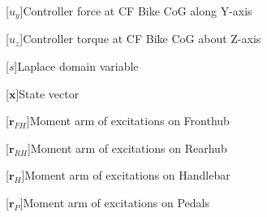 \begin{acronym}[LONGEST]
	[\ensuremath{u_y}]{\acrounit{\N}Controller force at CF Bike CoG along Y-axis}
\end{acronym}
\begin{acronym}[LONGEST]
	[\ensuremath{u_z}]{Controller torque at CF Bike CoG about Z-axis}
\end{acronym}
\begin{acronym}[LONGEST]
	[\ensuremath{s}]{\acrounit{-}Laplace domain variable}
\end{acronym}
\begin{acronym}[LONGEST]
	[\ensuremath{\mathbf{x}}]{\acrounit{-}State vector}
\end{acronym}
\begin{acronym}[LONGEST]
	[\ensuremath{\mathbf{r}_{FH}}]{\acrounit{\m}Moment arm of excitations on Fronthub}
\end{acronym}
\begin{acronym}[LONGEST]
	[\ensuremath{\mathbf{r}_{RH}}]{\acrounit{\m}Moment arm of excitations on Rearhub}
\end{acronym}
\begin{acronym}[LONGEST]
	[\ensuremath{\mathbf{r}_{H}}]{\acrounit{\m}Moment arm of excitations on Handlebar}
\end{acronym}
\begin{acronym}[LONGEST]
	[\ensuremath{\mathbf{r}_{P}}]{\acrounit{\m}Moment arm of excitations on Pedals}
\end{acronym}


